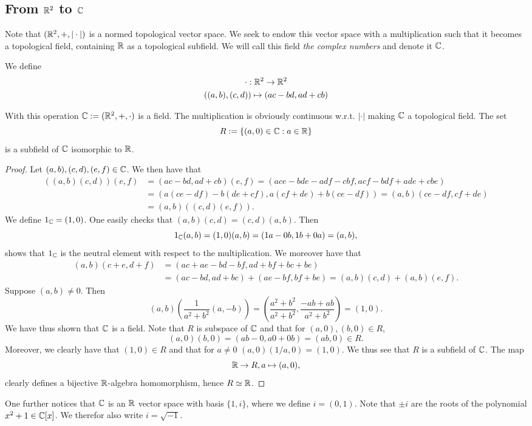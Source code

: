 \subsection{From $\mathbb{R}^2$ to $\mathbb{C}$}
    Note that $(\mathbb{R}^2,+,\vert \cdot\vert)$ is a normed topological vector space. We seek to endow this vector space with a multiplication such that it becomes a topological field, containing $\mathbb{R}$ as a topological subfield. We will call this field \textit{the complex numbers} and denote it $\mathbb{C}$. 
    \begin{definition}
        We define
        \begin{gather*}
            \cdot : \mathbb{R}^2 \rightarrow \mathbb{R}^2 \\
            ((a,b),(c,d))\mapsto (ac-bd,ad+cb)
        \end{gather*}
    \end{definition}
    \begin{proposition}
        With this operation $\mathbb{C} := (\mathbb{R}^2,+,\cdot)$ is a field. The multiplication is obviously continuous w.r.t. $\vert \cdot \vert$ making $\mathbb{C}$ a topological field. The set
        $$R:= \{(a,0)\in\mathbb{C} : a\in\mathbb{R}\}$$
        is a subfield of $\mathbb{C}$ isomorphic to $\mathbb{R}$.
    \end{proposition}
    \begin{proof}
        Let $(a,b),(c,d),(e,f)\in \mathbb{C}$. We then have that 
        \begin{align*}
            ((a,b)(c,d))(e,f) &= (ac-bd,ad+cb)(e,f) = (ace-bde-adf-cbf,acf-bdf+ade+cbe)\\
            &= (a(ce-df)-b(de+cf), a(cf+de)+b(ce-df))
            = (a,b)(ce-df,cf+de)\\ 
            &= (a,b)((c,d)(e,f)).
        \end{align*}
        We define $1_{\mathbb{C}} = (1,0)$. One easily checks that $(a,b)(c,d)=(c,d)(a,b)$. Then 
        $$1_{\mathbb{C}}(a,b)=(1,0)(a,b)=(1a-0b,1b+0a)=(a,b),$$
        shows that $1_{\mathbb{C}}$ is the neutral element with respect to the multiplication. We moreover have that 
        \begin{align*}
            (a,b)(c+e,d+f)&=(ac+ae-bd-bf,ad+bf+bc+be)\\ &=(ac-bd,ad+bc)+(ae-bf,bf+be) = (a,b)(c,d)+(a,b)(e,f).
        \end{align*}
        Suppose $(a,b)\neq 0$. Then 
        $$(a,b)\left( \frac{1}{a^2+b^2}(a,-b)\right) = \left(\frac{a^2+b^2}{a^2+b^2},\frac{-ab+ab}{a^2+b^2}\right)= (1,0).$$
        We have thus shown that $\mathbb{C}$ is a field. Note that $R$ is subspace of $\mathbb{C}$ and that for $(a,0),(b,0)\in R$,
        $$(a,0)(b,0)=(ab-0,a0+0b)=(ab,0)\in R.$$
        Moreover, we clearly have that $(1,0)\in R$ and that for $a\neq 0$ 
        $(a,0)(1/a,0)=(1,0)$. We thus see that $R$ is a subfield of $\mathbb{C}$. The map 
        $$\mathbb{R} \rightarrow R, a\mapsto (a,0),$$
        clearly defines a bijective $\mathbb{R}$-algebra homomorphism, hence $R\simeq \mathbb{R}$.
    \end{proof}
    \begin{remark}
        One further notices that $\mathbb{C}$ is an $\mathbb{R}$ vector space with basis $\{1,i\}$, where we define $i = (0,1)$. Note that $\pm i$ are the roots of the polynomial $x^2+1 \in\mathbb{C}[x]$. We therefor also write $i=\sqrt{-1}$.
    \end{remark} 